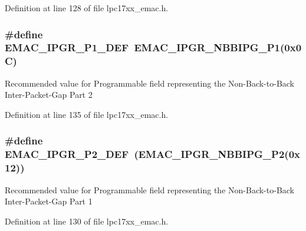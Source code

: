 \-Definition at line 128 of file lpc17xx\-\_\-emac.\-h.

\hypertarget{group___e_m_a_c___private___macros_ga91104ac19bcd33a9008dc0821eb8c62f}{
\subsubsection[{\-E\-M\-A\-C\-\_\-\-I\-P\-G\-R\-\_\-\-P1\-\_\-\-D\-E\-F}]{\setlength{\rightskip}{0pt plus 5cm}\#define {\bf \-E\-M\-A\-C\-\_\-\-I\-P\-G\-R\-\_\-\-P1\-\_\-\-D\-E\-F}~{\bf \-E\-M\-A\-C\-\_\-\-I\-P\-G\-R\-\_\-\-N\-B\-B\-I\-P\-G\-\_\-\-P1}(0x0\-C)}}\label{group___e_m_a_c___private___macros_ga91104ac19bcd33a9008dc0821eb8c62f}
\-Recommended value for \-Programmable field representing the \-Non-\/\-Back-\/to-\/\-Back \-Inter-\/\-Packet-\/\-Gap \-Part 2 

\-Definition at line 135 of file lpc17xx\-\_\-emac.\-h.

\hypertarget{group___e_m_a_c___private___macros_ga3ba8c2d804d34874f1e90250d1782e67}{
\subsubsection[{\-E\-M\-A\-C\-\_\-\-I\-P\-G\-R\-\_\-\-P2\-\_\-\-D\-E\-F}]{\setlength{\rightskip}{0pt plus 5cm}\#define {\bf \-E\-M\-A\-C\-\_\-\-I\-P\-G\-R\-\_\-\-P2\-\_\-\-D\-E\-F}~({\bf \-E\-M\-A\-C\-\_\-\-I\-P\-G\-R\-\_\-\-N\-B\-B\-I\-P\-G\-\_\-\-P2}(0x12))}}\label{group___e_m_a_c___private___macros_ga3ba8c2d804d34874f1e90250d1782e67}
\-Recommended value for \-Programmable field representing the \-Non-\/\-Back-\/to-\/\-Back \-Inter-\/\-Packet-\/\-Gap \-Part 1 

\-Definition at line 130 of file lpc17xx\-\_\-emac.\-h.

